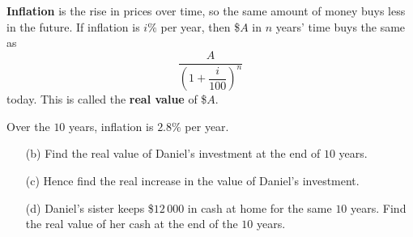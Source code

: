 \documentclass[12pt, twoside]{article}
\begin{document}
\begin{enumerate}[itemsep=0.15cm]
\textbf{Inflation} is the rise in prices over time, so the same amount of
money buys less in the future. If inflation is $i\%$ per year, then \$$A$
in $n$ years' time buys the same as
$$\frac{A}{\left(1 + \dfrac{i}{100}\right)^{n}}$$
today. This is called the \textbf{real value} of \$$A$.

Over the $10$ years, inflation is $2.8\%$ per year.

\begin{enumerate}[itemsep=0.1cm]
  \item[(b)] Find the real value of Daniel's investment at the end of
  $10$ years.
  \item[(c)] Hence find the real increase in the value of Daniel's
  investment.
  \item[(d)] Daniel's sister keeps \$$12\,000$ in cash at home for the
  same $10$ years. Find the real value of her cash at the end of the
  $10$ years.
\end{enumerate}


\end{enumerate}
\end{document}
